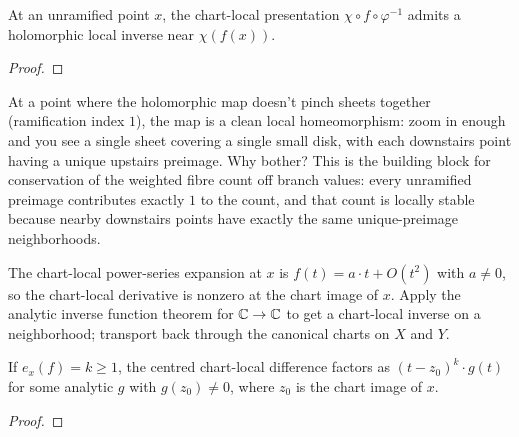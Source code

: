 \begin{lemma}
\label{lem:chart-local-inverse-unramified}
At an unramified point \(x\), the chart-local presentation
\(\chi\circ f\circ\varphi^{-1}\) admits a holomorphic local inverse
near \(\chi(f(x))\).
\leanok
\end{lemma}
\begin{proof}\leanok\end{proof}

\begin{layman}
At a point where the holomorphic map doesn't pinch sheets together
(ramification index \(1\)), the map is a clean local
homeomorphism: zoom in enough and you see a single sheet covering a
single small disk, with each downstairs point having a unique upstairs
preimage. Why bother? This is the building block for conservation of
the weighted fibre count off branch values: every unramified preimage
contributes exactly \(1\) to the count, and that count is locally
stable because nearby downstairs points have exactly the same
unique-preimage neighborhoods.
\end{layman}

\begin{proofsketch}
The chart-local power-series expansion at \(x\) is
\(f(t)=a\cdot t+O(t^2)\) with \(a\ne 0\), so the chart-local derivative
is nonzero at the chart image of \(x\). Apply the analytic inverse
function theorem for \(\mathbb{C}\to\mathbb{C}\) to get a chart-local inverse on a
neighborhood; transport back through the canonical charts on \(X\)
and \(Y\).
\end{proofsketch}

\begin{lemma}
\label{lem:chart-local-pow-mul}
If \(e_x(f)=k\ge 1\), the centred chart-local difference factors as
\((t-z_0)^k\cdot g(t)\) for some analytic \(g\) with \(g(z_0)\ne 0\),
where \(z_0\) is the chart image of \(x\).
\leanok
\end{lemma}
\begin{proof}\leanok\end{proof}

